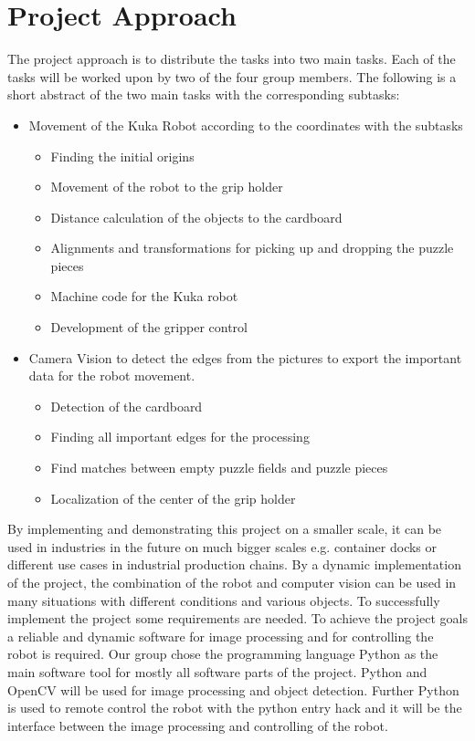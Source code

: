 \documentclass[a4paper, 12pt]{scrartcl}%
\begin{document}
\section{Project Approach}
The project approach is to distribute the tasks into two main tasks. Each of the tasks will be worked upon by two of the four group members. The following is a short abstract of the two main tasks with the corresponding subtasks:\newline
\begin{itemize}
	\item Movement of the Kuka Robot according to the coordinates with the subtasks
	\begin{itemize}
		\item Finding the initial origins
		\item Movement of the robot to the grip holder
		\item Distance calculation of the objects to the cardboard
		\item Alignments and transformations for picking up and dropping the puzzle pieces 
		\item Machine code for the Kuka robot
		\item Development of the gripper control 		
	\end{itemize}
	\item Camera Vision to detect the edges from the pictures to export the important data for the robot movement.
	\begin{itemize}
		\item Detection of the cardboard
		\item Finding all important edges for the processing
		\item Find matches between empty puzzle fields and puzzle pieces
		\item Localization of the center of the grip holder		
	\end{itemize}
\end{itemize}
By implementing and demonstrating this project on a smaller scale, it can be used in industries in the future on much bigger scales e.g. container docks or different use cases in industrial production chains. By a dynamic implementation of the project, the combination of the robot and computer vision can be used in many situations with different conditions and various objects.\newline
To successfully implement the project some requirements are needed. To achieve the project goals a reliable and dynamic software for image processing and for controlling the robot is required. Our group chose the programming language Python as the main software tool for mostly all software parts of the project. Python and OpenCV will be used for image processing and object detection. Further Python is used to remote control the robot with the python entry hack and it will be the interface between the image processing and controlling of the robot.\newline
\end{document}
